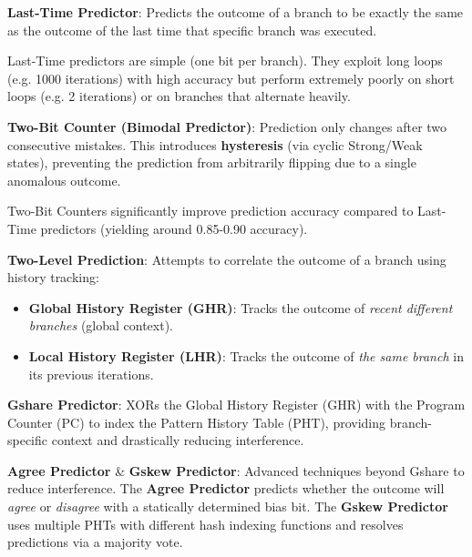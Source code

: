 \begin{definition}
	\textbf{Last-Time Predictor}: Predicts the outcome of a branch to be exactly the same as the outcome of the last time that specific branch was executed.
\end{definition}
\begin{remark}
	Last-Time predictors are simple (one bit per branch). They exploit long loops (e.g. 1000 iterations) with high accuracy but perform extremely poorly on short loops (e.g. 2 iterations) or on branches that alternate heavily.
\end{remark}

\begin{definition}
	\textbf{Two-Bit Counter (Bimodal Predictor)}: Prediction only changes after two consecutive mistakes. This introduces \textbf{hysteresis} (via cyclic Strong/Weak states), preventing the prediction from arbitrarily flipping due to a single anomalous outcome.
\end{definition}
\begin{remark}
	Two-Bit Counters significantly improve prediction accuracy compared to Last-Time predictors (yielding around 0.85-0.90 accuracy).
\end{remark}

\begin{definition}
	\textbf{Two-Level Prediction}: Attempts to correlate the outcome of a branch using history tracking:
	\begin{itemize}
		\item \textbf{Global History Register (GHR)}: Tracks the outcome of \textit{recent different branches} (global context).
		\item \textbf{Local History Register (LHR)}: Tracks the outcome of \textit{the same branch} in its previous iterations.
	\end{itemize}
\end{definition}

\begin{definition}
	\textbf{Gshare Predictor}: XORs the Global History Register (GHR) with the Program Counter (PC) to index the Pattern History Table (PHT), providing branch-specific context and drastically reducing interference.
\end{definition}

\begin{definition}
	\textbf{Agree Predictor} \& \textbf{Gskew Predictor}: Advanced techniques beyond Gshare to reduce interference. The \textbf{Agree Predictor} predicts whether the outcome will \textit{agree} or \textit{disagree} with a statically determined bias bit. The \textbf{Gskew Predictor} uses multiple PHTs with different hash indexing functions and resolves predictions via a majority vote.
\end{definition}

